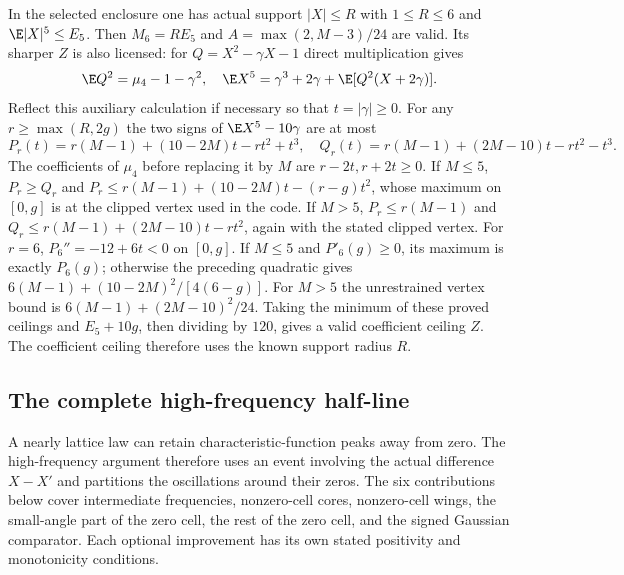 In the selected enclosure one has actual support $|X|\le R$
with $1\le R\le6$ and $\E|X|^5\le E_5$. Then $M_6=RE_5$ and
$A=\max(2,M-3)/24$ are valid. Its sharper $Z$ is also licensed:
for $Q=X^2-\gamma X-1$ direct multiplication gives
\[
 \E Q^2=\mu_4-1-\gamma^2,\quad
 \E X^5=\gamma^3+2\gamma+\E[Q^2(X+2\gamma)].
\]
Reflect this auxiliary calculation if necessary so that
$t=|\gamma|\ge0$. For any $r\ge\max(R,2g)$ the two signs of
$\E X^5-10\gamma$ are at most
\[
 P_r(t)=r(M-1)+(10-2M)t-rt^2+t^3,
 \quad Q_r(t)=r(M-1)+(2M-10)t-rt^2-t^3.
\]
The coefficients of $\mu_4$ before replacing it by $M$ are
$r-2t,r+2t\ge0$. If $M\le5$, $P_r\ge Q_r$ and
$P_r\le r(M-1)+(10-2M)t-(r-g)t^2$, whose maximum on $[0,g]$
is at the clipped vertex used in the code. If $M>5$,
$P_r\le r(M-1)$ and
$Q_r\le r(M-1)+(2M-10)t-rt^2$, again with the stated clipped vertex.
For $r=6$, $P_6''=-12+6t<0$ on $[0,g]$. If $M\le5$ and
$P'_6(g)\ge0$, its maximum is exactly $P_6(g)$; otherwise the
preceding quadratic gives $6(M-1)+(10-2M)^2/[4(6-g)]$.
For $M>5$ the unrestrained vertex bound is
$6(M-1)+(2M-10)^2/24$. Taking the minimum of these proved ceilings
and $E_5+10g$, then dividing by $120$, gives a valid coefficient ceiling $Z$.
The coefficient ceiling therefore uses the known support radius $R$.

\subsection{The complete high-frequency half-line}

A nearly lattice law can retain characteristic-function peaks away from
zero. The high-frequency argument therefore uses an event involving the
actual difference $X-X'$ and partitions the oscillations around their
zeros. The six contributions below cover intermediate frequencies,
nonzero-cell cores, nonzero-cell wings, the small-angle part of the zero
cell, the rest of the zero cell, and the signed Gaussian comparator.
Each optional improvement has its own stated positivity and monotonicity
conditions.

